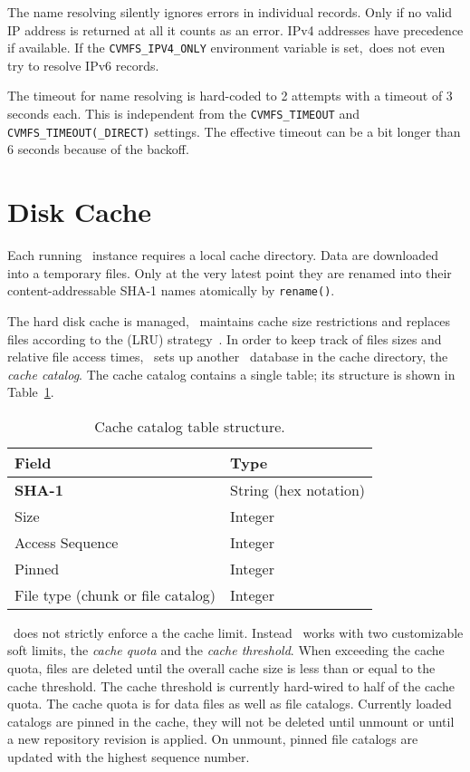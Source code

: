 The name resolving silently ignores errors in individual records.
Only if no valid IP address is returned at all it counts as an error.
IPv4 addresses have precedence if available.
If the \texttt{CVMFS\_IPV4\_ONLY} environment variable is set,\cvmfs\ does not even try to resolve IPv6 records.

The timeout for name resolving is hard-coded to 2 attempts with a timeout of 3 seconds each.
This is independent from the \texttt{CVMFS\_TIMEOUT} and \texttt{CVMFS\_TIMEOUT(\_DIRECT)} settings.
The effective timeout can be a bit longer than 6 seconds because of the backoff.

\section{Disk Cache}
\label{sct:mamangedcache}
Each running \cvmfs\ instance requires a local cache directory.
Data are downloaded into a temporary files.
Only at the very latest point they are renamed into their content-addressable SHA-1 names atomically by \texttt{rename()}.

The hard disk cache is managed, \ie \cvmfs\ maintains cache size restrictions and replaces files according to the  (LRU) strategy~\cite{lru06}.
In order to keep track of files sizes and relative file access times, \cvmfs\ sets up another \sqlite\ database in the cache directory, the \emph{cache catalog}.
The cache catalog contains a single table; its structure is shown in Table~\ref{tab:cachecatalog}.
\begin{table}
	\begin{center}
		\begin{tabular}{ll}
			\toprule
			\bf Field 							& \bf Type \\
			\midrule
			\bf SHA-1 							& String (hex notation) \\
			Size 								& Integer \\
			Access Sequence						& Integer \\
			Pinned								& Integer \\
			File type (chunk or file catalog)	& Integer\\
			\bottomrule
		\end{tabular}
	\end{center}
	\caption{Cache catalog table structure.}
	\label{tab:cachecatalog}
\end{table}

\cvmfs\ does not strictly enforce a the cache limit.
Instead \cvmfs\ works with two customizable soft limits, the \emph{cache quota} and the \emph{cache threshold}.
When exceeding the cache quota, files are deleted until the overall cache size is less than or equal to the cache threshold.
The cache threshold is currently hard-wired to half of the cache quota.
The cache quota is for data files as well as file catalogs.
Currently loaded catalogs are pinned in the cache, \ie they will not be deleted until unmount or until a new repository revision is applied.
On unmount, pinned file catalogs are updated with the highest sequence number.

